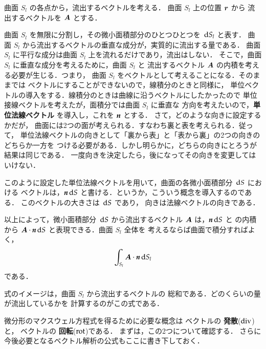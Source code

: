         曲面 $S_{l}$ の各点から，流出するベクトルを考える．
        曲面 $S_{l}$ 上の位置 $\boldsymbol{r}$ から
        流出するベクトルを $\boldsymbol{A}$ とする．

        曲面 $S_{l}$ を無限に分割し，その微小面積部分のひとつひとつを $\,\mathrm{d} S_{l}$ と表す．
        曲面 $S_{l}$ から流出するベクトルの垂直な成分が，実質的に流出する量である．
        曲面 $S_{l}$ に平行な成分は曲面 $S_{l}$ 上を流れるだけであり，流出はしない．
        そこで，曲面 $S_{l}$ に垂直な成分を考えるために，曲面 $S_{l}$ と
        流出するベクトル $\boldsymbol{A}$ の内積を考える必要が生じる．つまり，
        曲面 $S_{l}$ をベクトルとして考えることになる．そのままでは
        ベクトルにすることができないので，線積分のときと同様に，
        単位ベクトルの導入をする．線積分のときは曲線に沿うベクトルにしたかったので
        単位接線ベクトルを考えたが，面積分では曲面 $S_{l}$ に垂直な
        方向を考えたいので，\textbf{単位法線ベクトル} を導入し，これを $\textit{\textbf{n}}$ とする．
        さて，どのような向きに設定するかだが，
        曲面には2つの面が考えられる．すなわち裏と表を考えられる．従って，
        単位法線ベクトルの向きとして「裏から表」と「表から裏」の2つの向きのどちらか一方を
        つける必要がある．しかし明らかに，どちらの向きにとろうが結果は同じである．
        一度向きを決定したら，後になってその向きを変更してはいけない．

        このように設定した単位法線ベクトルを用いて，曲面の各微小面積部分 $\,\mathrm{d} S$ における
        ベクトルは，$\textit{\textbf{n}}\,\mathrm{d} S$ と書ける．というか，こういう概念を導入するのである．
        このベクトルの大きさは $\,\mathrm{d} S$ であり，
        向きは法線ベクトルの向きである．

        以上によって，微小面積部分 $\,\mathrm{d} S$ から流出するベクトル $\boldsymbol{A}$ は，$\textit{\textbf{n}}\,\mathrm{d} S$ と
        の内積から $\boldsymbol{A}\cdot\textit{\textbf{n}}\,\mathrm{d} S$ と表現できる．曲面 $S_{l}$ 全体を
        考えるならば曲面で積分すればよく，
        \begin{align}
        \int_{S_{l}} \boldsymbol{A}\cdot \textit{\textbf{n}}\,\mathrm{d} S_{l}
        \end{align}
        である．

        式のイメージは，曲面 $S_{l}$ から流出するベクトルの
        総和である．どのくらいの量が流出しているかを
        計算するのがこの式である．

        微分形のマクスウェル方程式を得るために必要な概念は
        ベクトルの \textbf{発散}($\rm{div}$)と，
        ベクトルの \textbf{回転}($\rm{rot}$)である．
        まずは，この2つについて確認する．
        さらに今後必要となるベクトル解析の公式もここに書き下しておく．


